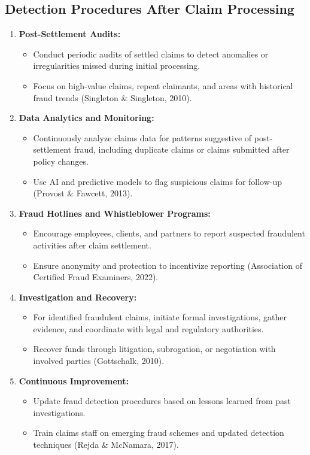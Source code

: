 \documentclass[12pt,a4paper]{article}
\begin{document}
\subsection{Detection Procedures After Claim Processing}
\begin{enumerate}
    \item \textbf{Post-Settlement Audits:}
    \begin{itemize}
        \item Conduct periodic audits of settled claims to detect anomalies or irregularities missed during initial processing.
        \item Focus on high-value claims, repeat claimants, and areas with historical fraud trends (Singleton \& Singleton, 2010).
    \end{itemize}
    \item \textbf{Data Analytics and Monitoring:}
    \begin{itemize}
        \item Continuously analyze claims data for patterns suggestive of post-settlement fraud, including duplicate claims or claims submitted after policy changes.
        \item Use AI and predictive models to flag suspicious claims for follow-up (Provost \& Fawcett, 2013).
    \end{itemize}
    \item \textbf{Fraud Hotlines and Whistleblower Programs:}
    \begin{itemize}
        \item Encourage employees, clients, and partners to report suspected fraudulent activities after claim settlement.
        \item Ensure anonymity and protection to incentivize reporting (Association of Certified Fraud Examiners, 2022).
    \end{itemize}
    \item \textbf{Investigation and Recovery:}
    \begin{itemize}
        \item For identified fraudulent claims, initiate formal investigations, gather evidence, and coordinate with legal and regulatory authorities.
        \item Recover funds through litigation, subrogation, or negotiation with involved parties (Gottschalk, 2010).
    \end{itemize}
    \item \textbf{Continuous Improvement:}
    \begin{itemize}
        \item Update fraud detection procedures based on lessons learned from past investigations.
        \item Train claims staff on emerging fraud schemes and updated detection techniques (Rejda \& McNamara, 2017).
    \end{itemize}
\end{enumerate}
\end{document}
